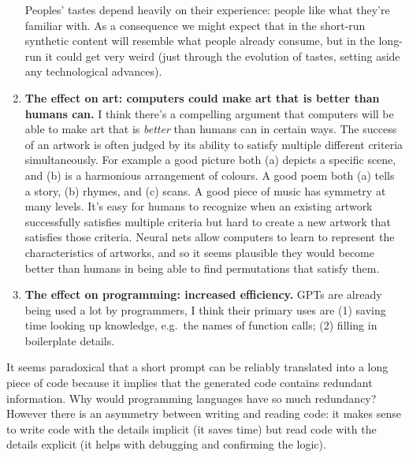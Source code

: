 \documentclass[
  11pt,
  letterpaper,
  DIV=11,
  numbers=noendperiod,
  oneside]{scrartcl}
\begin{document}
\begin{enumerate}
  Peoples' tastes depend heavily on their experience: people like what
  they're familiar with. As a consequence we might expect that in the
  short-run synthetic content will resemble what people already consume,
  but in the long-run it could get very weird (just through the
  evolution of tastes, setting aside any technological advances).
\item
  \textbf{The effect on art: computers could make art that is better
  than humans can.} I think there's a compelling argument that computers
  will be able to make art that is \emph{better} than humans can in
  certain ways. The success of an artwork is often judged by its ability
  to satisfy multiple different criteria simultaneously. For example a
  good picture both (a) depicts a specific scene, and (b) is a
  harmonious arrangement of colours. A good poem both (a) tells a story,
  (b) rhymes, and (c) scans. A good piece of music has symmetry at many
  levels. It's easy for humans to recognize when an existing artwork
  successfully satisfies multiple criteria but hard to create a new
  artwork that satisfies those criteria. Neural nets allow computers to
  learn to represent the characteristics of artworks, and so it seems
  plausible they would become better than humans in being able to find
  permutations that satisfy them.
\item
  \textbf{The effect on programming: increased efficiency.} GPTs are
  already being used a lot by programmers, I think their primary uses
  are (1) saving time looking up knowledge, e.g.~the names of function
  calls; (2) filling in boilerplate details.
\end{enumerate}

It seems paradoxical that a short prompt can be reliably translated into
a long piece of code because it implies that the generated code contains
redundant information. Why would programming languages have so much
redundancy? However there is an asymmetry between writing and reading
code: it makes sense to write code with the details implicit (it saves
time) but read code with the details explicit (it helps with debugging
and confirming the logic).
\end{document}
